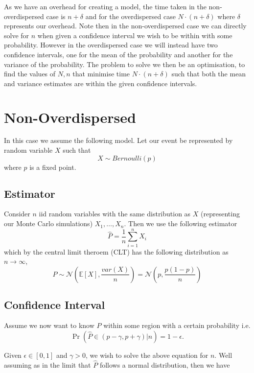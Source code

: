 \documentclass[
10pt, %
a4paper, %
oneside, %
headinclude,footinclude, %
BCOR5mm, %
]{scrartcl}
\begin{document}
As we have an overhead for creating a model, the time taken in the non-overdispersed case is $n + \delta$ and for the overdispersed case $N \cdot (n +\delta)$ where $\delta$ represents our overhead. Note then in the non-overdispersed case we can directly solve for $n$ when given a confidence interval we wish to be within with some probability. However in the overdispersed case we will instead have two confidence intervals, one for the mean of the probability and another for the variance of the probability. The problem to solve we then be an optimisation, to find the values of $N, n$ that minimise time $N \cdot (n +\delta)$ such that both the mean and variance estimates are within the given confidence intervals.
 

\section{Non-Overdispersed}
In this case we assume the following model. Let our event be represented by random variable $X$ such that
$$ X \sim Bernoulli(p) $$
where $p$ is a fixed point.

\subsection{Estimator}
Consider $n$ iid random variables with the same distribution as $X$ (representing our Monte Carlo simulations) $X_1, \dots, X_n$. Then we use the following estimator
$$ \hat{P} = \frac{1}{n} \sum_{i=1}^n X_i $$
which by the central limit theroem (CLT) has the following distribution as $n \rightarrow \infty$,
$$ \hat{P} \sim \mathcal{N} \left ( \mathbb{E}[X], \frac{var(X)}{n} \right ) = \mathcal{N} \left( p, \frac{p(1-p)}{n} \right)$$

\subsection{Confidence Interval}
Assume we now want to know $\hat{P}$ within some region with a certain probability i.e.
$$ \Pr (\hat{P} \in (p - \gamma, p + \gamma)|n ) = 1 - \epsilon. $$

Given $\epsilon \in [0,1]$ and $\gamma > 0$, we wish to solve the above equation for $n$. Well assuming as in the limit that $\hat{P}$ follows a normal distribution, then we have
\end{document}
